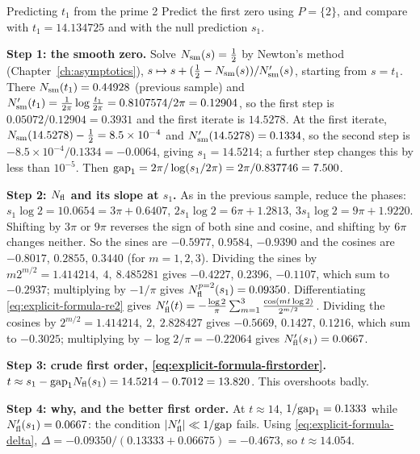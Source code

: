 \begin{sample}{Predicting $t_1$ from the prime 2}
Predict the first zero using $P=\{2\}$, and compare with $t_1=14.134725$ and with the null prediction $s_1$.

\textbf{Step 1: the smooth zero.} Solve $N_{\mathrm{sm}}(s)=\tfrac12$ by Newton's method (Chapter~\ref{ch:asymptotics}), $s\mapsto s+(\tfrac12-N_{\mathrm{sm}}(s))/N_{\mathrm{sm}}'(s)$, starting from $s=t_1$. There $N_{\mathrm{sm}}(t_1)=0.44928$ (previous sample) and $N_{\mathrm{sm}}'(t_1)=\frac{1}{2\pi}\log\frac{t_1}{2\pi}=0.8107574/2\pi=0.12904$, so the first step is $0.05072/0.12904=0.3931$ and the first iterate is $14.5278$. At the first iterate, $N_{\mathrm{sm}}(14.5278)-\tfrac12=8.5\times10^{-4}$ and $N_{\mathrm{sm}}'(14.5278)=0.1334$, so the second step is $-8.5\times10^{-4}/0.1334=-0.0064$, giving $s_1=14.5214$; a further step changes this by less than $10^{-5}$. Then $\mathrm{gap}_1=2\pi/\log(s_1/2\pi)=2\pi/0.837746=7.500$.

\textbf{Step 2: $N_{\mathrm{fl}}$ and its slope at $s_1$.} As in the previous sample, reduce the phases: $s_1\log2=10.0654=3\pi+0.6407$, $2s_1\log2=6\pi+1.2813$, $3s_1\log2=9\pi+1.9220$. Shifting by $3\pi$ or $9\pi$ reverses the sign of both sine and cosine, and shifting by $6\pi$ changes neither. So the sines are $-0.5977$, $0.9584$, $-0.9390$ and the cosines are $-0.8017$, $0.2855$, $0.3440$ (for $m=1,2,3$). Dividing the sines by $m2^{m/2}=1.414214,\ 4,\ 8.485281$ gives $-0.4227$, $0.2396$, $-0.1107$, which sum to $-0.2937$; multiplying by $-1/\pi$ gives $N^{p=2}_{\rm fl}(s_1)=0.09350$. Differentiating \cref{eq:explicit-formula-re2} gives $N_{\mathrm{fl}}'(t)=-\frac{\log2}{\pi}\sum_{m=1}^3\frac{\cos(mt\log2)}{2^{m/2}}$. Dividing the cosines by $2^{m/2}=1.414214,\ 2,\ 2.828427$ gives $-0.5669$, $0.1427$, $0.1216$, which sum to $-0.3025$; multiplying by $-\log2/\pi=-0.22064$ gives $N_{\mathrm{fl}}'(s_1)=0.0667$.

\textbf{Step 3: crude first order, \cref{eq:explicit-formula-firstorder}.} $t\approx s_1-\mathrm{gap}_1N_{\mathrm{fl}}(s_1)=14.5214-0.7012=13.820$. This overshoots badly.

\textbf{Step 4: why, and the better first order.} At $t\approx14$, $1/\mathrm{gap}_1=0.1333$ while $N_{\mathrm{fl}}'(s_1)=0.0667$: the condition $\left\lvert N_{\mathrm{fl}}'\right\rvert\ll1/\mathrm{gap}$ fails. Using \cref{eq:explicit-formula-delta}, $\Delta=-0.09350/(0.13333+0.06675)=-0.4673$, so $t\approx14.054$.


\end{sample}

